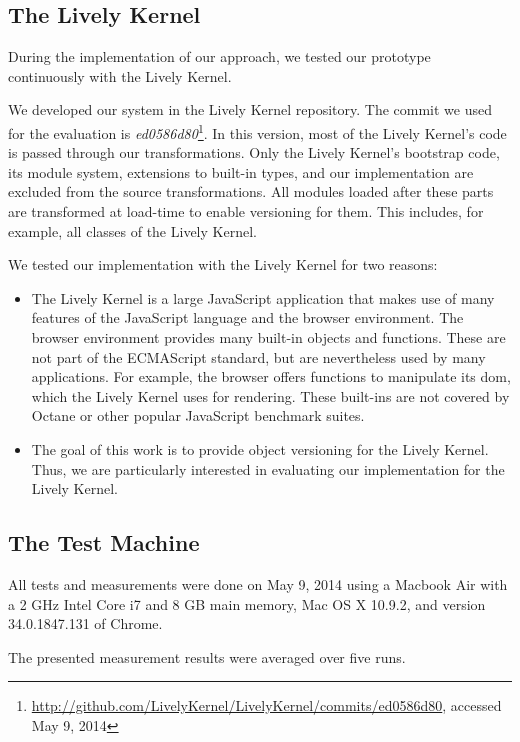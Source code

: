 \subsection{The Lively Kernel}

During the implementation of our approach, we tested our prototype continuously with the Lively Kernel.

We developed our system in the Lively Kernel repository.
The commit we used for the evaluation is \emph{ed0586d80}\footnote{\url{http://github.com/LivelyKernel/LivelyKernel/commits/ed0586d80}, accessed May 9, 2014}. In this version, most of the Lively Kernel's code is passed through our transformations.
Only the Lively Kernel's bootstrap code, its module system, extensions to built-in types, and our implementation are excluded from the source transformations.
All modules loaded after these parts are transformed at load-time to enable versioning for them.
This includes, for example, all classes of the Lively Kernel.

We tested our implementation with the Lively Kernel for two reasons:

\begin{itemize}
    \item The Lively Kernel is a large JavaScript application that makes use of many features of the JavaScript language and the browser environment. The browser environment provides many built-in objects and functions. These are not part of the ECMAScript standard, but are nevertheless used by many applications. For example, the browser offers functions to manipulate its \ac{dom}, which the Lively Kernel uses for rendering. These built-ins are not covered by Octane or other popular JavaScript benchmark suites. 
    \item The goal of this work is to provide object versioning for the Lively Kernel. Thus, we are particularly interested in evaluating our implementation for the Lively Kernel.
\end{itemize}


\subsection{The Test Machine}

All tests and measurements were done on May 9, 2014 using a Macbook Air with a 2 GHz Intel Core i7 and 8 GB main memory, Mac OS X 10.9.2, and version 34.0.1847.131 of Chrome.

The presented measurement results were averaged over five runs.


